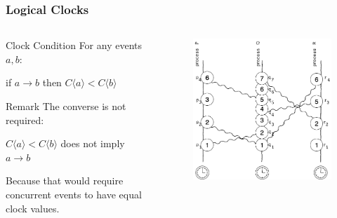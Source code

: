 \documentclass{beamer}
\begin{document}
\frame
{
	\frametitle{Logical Clocks}

	\begin{columns}
	\begin{column}{0.6\textwidth}

		\begin{block}{Clock Condition}
			For any events $a,b$:

			if $a\to b$ then $C\langle a\rangle < C\langle b\rangle$
		\end{block}

		\begin{block}{Remark}
			The converse is not required:

			$C\langle a\rangle < C\langle b\rangle$ does not imply $a\to b$

			Because that would require concurrent events to have equal clock values.
		\end{block}


	\end{column}
	\begin{column}{0.4\textwidth}

		\begin{figure}[ht!]
		\includegraphics[width=\textwidth]{files/ClockDist-Logical-Clock.png}
		\end{figure}


	\end{column}
	\end{columns}


}
\end{document}
